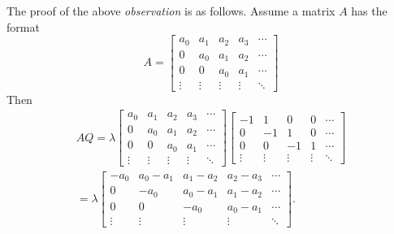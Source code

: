 \documentclass[  11pt]{article}
\begin{document}
\begin{ExerciseList}
{\footnotesize 
The proof of the above {\it observation} is as follows.
Assume a matrix $A$ has the format
\[A=  \begin{bmatrix}
a_0 & a_1 & a_2 & a_3 & \cdots \\
0 & a_0 & a_1 & a_2 & \cdots \\
0 & 0 &a_0 & a_1   & \cdots \\
\vdots & \vdots & \vdots & \vdots & \ddots
\end{bmatrix} 
\]
Then 
\[\begin{split}AQ=\lambda\begin{bmatrix}
a_0 & a_1 & a_2 & a_3 & \cdots \\
0 & a_0 & a_1 & a_2 & \cdots \\
0 & 0 &a_0 & a_1   & \cdots \\
\vdots & \vdots & \vdots & \vdots & \ddots
\end{bmatrix} 
 \begin{bmatrix}
-1 & 1 & 0 & 0 & \cdots \\
0 & -1 & 1 & 0 & \cdots \\
0 & 0 &-1&  1  & \cdots \\
\vdots & \vdots & \vdots & \vdots & \ddots
\end{bmatrix}
\\
=\lambda \begin{bmatrix}
-a_0 & a_0-a_1 & a_1-a_2 & a_2-a_3 & \cdots \\
0 & -a_0 & a_0-a_1 & a_1-a_2 &   \cdots \\
0 & 0 &-a_0&  a_0-a_1  & \cdots \\
\vdots & \vdots & \vdots & \vdots & \ddots
\end{bmatrix}.
\end{split}
\]}


\end{ExerciseList}
\end{document}
